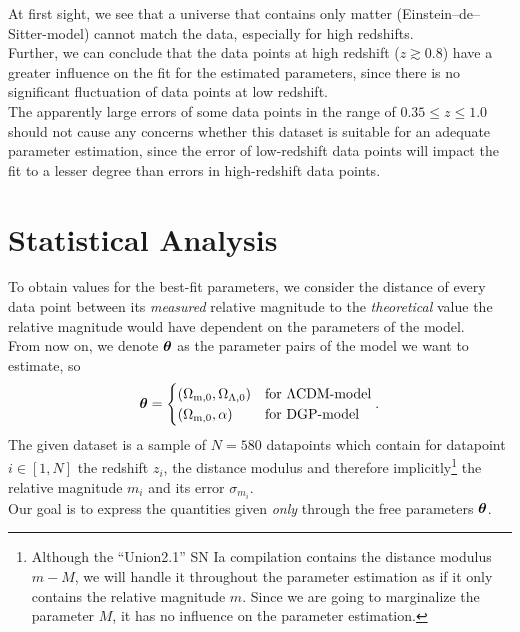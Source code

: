\noindent At first sight, we see that a universe that contains only matter (Einstein--de--Sitter-model) cannot match the data, especially for high redshifts. \\
Further, we can conclude that the data points at high redshift ($z \gtrsim 0.8$) have a greater influence on the fit for the estimated parameters, since there is no significant fluctuation of data points at low redshift. \\
The apparently large errors of some data points in the range of $0.35 \leq z \leq 1.0$ should not cause any concerns whether this dataset is suitable for an adequate parameter estimation, since the error of low-redshift data points will impact the fit to a lesser degree than errors in high-redshift data points.

\section{Statistical Analysis}
To obtain values for the best-fit parameters, we consider the distance of every data point between its \textit{measured} relative magnitude to the \textit{theoretical} value the relative magnitude would have dependent on the parameters of the model. \\ 
From now on, we denote $\vb*{\theta}$ as the parameter pairs of the model we want to estimate, so 
\begin{align}
    \vb*{\theta} = \begin{cases}
                        (\Omega_{\text{m},0}, \Omega_{\Lambda,0}) &\text{for $\Lambda$CDM-model}\\
                        (\Omega_{\text{m},0}, \alpha)             &\text{for DGP-model}\\
                   \end{cases}. \label{eq:cosmological-parameters}
\end{align}
The given dataset is a sample of $N = 580$ datapoints which contain for datapoint $i \in [1,N]$ the redshift $z_{i}$, the distance modulus and therefore implicitly\footnote{Although the ``Union2.1'' SN Ia compilation contains the distance modulus $m - M$, we will handle it throughout the parameter estimation as if it only contains the relative magnitude $m$. Since we are going to marginalize the parameter $M$, it has no influence on the parameter estimation.} the relative magnitude $m_{i}$ and its error $\sigma_{m_{i}}$. \\
Our goal is to express the quantities given \textit{only} through the free parameters $\vb*{\theta}$. \\
